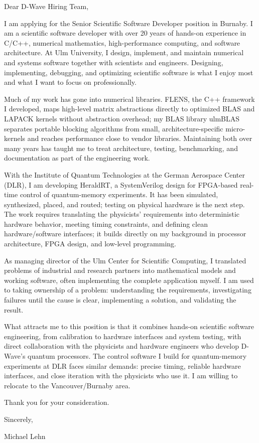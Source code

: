\documentclass[10pt]{article}
\begin{document}
\fontsize{10bp}{13.1346bp}\selectfont
\frenchspacing       %
\emergencystretch=0bp

Dear D-Wave Hiring Team,

I am applying for the Senior Scientific Software Developer position in Burnaby. I am a scientific software developer with over 20 years of hands-on experience in C/C++, numerical mathematics, high-performance computing, and software architecture. At Ulm University, I design, implement, and maintain numerical and systems software together with scientists and engineers. Designing, implementing, debugging, and optimizing scientific software is what I enjoy most and what I want to focus on professionally.

Much of my work has gone into numerical libraries. FLENS, the C++ framework I developed, maps high-level matrix abstractions directly to optimized BLAS and LAPACK kernels without abstraction overhead; my BLAS library ulmBLAS separates portable blocking algorithms from small, architecture-specific micro-kernels and reaches performance close to vendor libraries. Maintaining both over many years has taught me to treat architecture, testing, benchmarking, and documentation as part of the engineering work.

With the Institute of Quantum Technologies at the German Aerospace Center (DLR), I am developing HeraldRT, a SystemVerilog design for FPGA-based real-time control of quantum-memory experiments. It has been simulated, synthesized, placed, and routed; testing on physical hardware is the next step. The work requires translating the physicists' requirements into deterministic hardware behavior, meeting timing constraints, and defining clean hardware/software interfaces; it builds directly on my background in processor architecture, FPGA design, and low-level programming.

As managing director of the Ulm Center for Scientific Computing, I translated problems of industrial and research partners into mathematical models and working software, often implementing the complete application myself. I am used to taking ownership of a problem: understanding the requirements, investigating failures until the cause is clear, implementing a solution, and validating the result.

What attracts me to this position is that it combines hands-on scientific software engineering, from calibration to hardware interfaces and system testing, with direct collaboration with the physicists and hardware engineers who develop D-Wave's quantum processors. The control software I build for quantum-memory experiments at DLR faces similar demands: precise timing, reliable hardware interfaces, and close iteration with the physicists who use it. I am willing to relocate to the Vancouver/Burnaby area.

Thank you for your consideration.

Sincerely,

Michael Lehn
\end{document}
